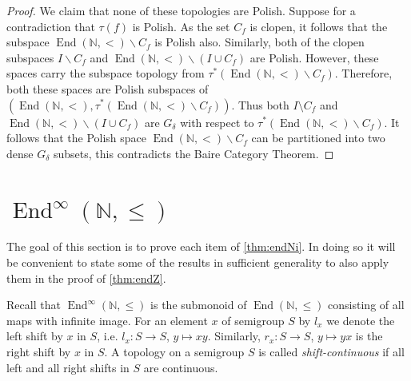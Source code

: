 \documentclass[11pt]{amsart}
\theoremstyle{definition}
\newcommand{\N}{\mathbb N}
\newcommand{\End}{\operatorname{End}(\mathbb N, <)}
\newcommand{\Endd}{\operatorname{End}(\mathbb N, \leq)}
\begin{document}
\begin{proof}
    We claim that none of these topologies are Polish.
    Suppose for a contradiction that \(\tau(f)\) is Polish. As the set \(C_f\) is clopen, it follows that the subspace \(\End \backslash C_f\) is Polish also.
    Similarly, both of the clopen subspaces \(I\backslash C_f\) and \(\End \backslash (I\cup C_f) \) are Polish.
    However, these spaces carry the subspace topology from \(\tau^*(\End \backslash C_f)\). 
    Therefore, both these spaces are Polish subspaces of \((\End,\tau^*(\End \backslash C_f))\). Thus both  \(I\setminus C_f\) and \(\End \backslash (I\cup C_f)\) are \(G_\delta\) with respect to \(\tau^*(\End \backslash C_f)\). 
    It follows that the Polish space \(\End\backslash C_f\) can be partitioned into two dense \(G_\delta\) subsets, this contradicts the Baire Category Theorem.
\end{proof}

\section{$\operatorname{End}^\infty(\N,\leq)$}
The goal of this section is to prove each item of \cref{thm:endNi}. In doing so it will be convenient to state some of the results in sufficient generality to also apply them in the proof of \cref{thm:endZ}.

Recall that $\operatorname{End}^\infty(\N,\leq)$ is the submonoid of $\Endd$ consisting of all maps with infinite image. For an element $x$ of semigroup $S$ by $l_x$ we denote the left shift by $x$ in $S$, i.e. $l_x: S\rightarrow S$, $y\mapsto xy$. Similarly,  $r_x: S\rightarrow S$, $y\mapsto yx$ is the right shift by $x$ in $S$. A topology on a semigroup $S$ is called {\em shift-continuous} if all left and all right shifts in $S$ are continuous.
\end{document}
